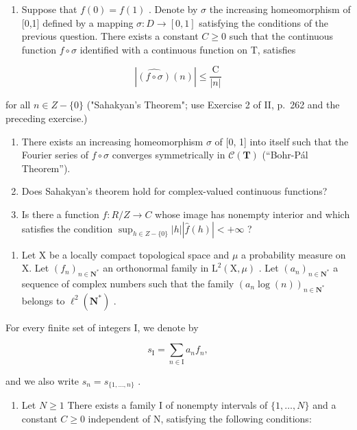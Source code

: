 \begin{enumerate}
\def\labelenumi{\alph{enumi})}
\setcounter{enumi}{2}
\tightlist
\item
  Suppose that \(f(0) = f(1)\) . Denote by \(\sigma\) the increasing homeomorphism of {[}0,1{]} defined by a mapping \(\sigma: D \to [0,1]\) satisfying the conditions of the previous question. There exists a constant \(C \geqslant 0\) such that the continuous function \(f \circ \sigma\) identified with a continuous function on T, satisfies
\end{enumerate}

\[
| \widehat {(f \circ \sigma)} (n) | \leqslant \frac {\mathrm{C}}{| n |}
\]

for all \(n \in Z - \{0\}\) ("Sahakyan's Theorem"; use Exercise 2 of II, p.~262 and the preceding exercise.)

\begin{enumerate}
\def\labelenumi{\alph{enumi})}
\setcounter{enumi}{3}
\item
  There exists an increasing homeomorphism \(\sigma\) of {[}0, 1{]} into itself such that the Fourier series of \(f \circ \sigma\) converges symmetrically in \(\mathcal{C}(\mathbf{T})\) (“Bohr-Pál Theorem”).
\item
  Does Sahakyan's theorem hold for complex-valued continuous functions?
\item
  Is there a function \(f: R/Z \to C\) whose image has nonempty interior and which satisfies the condition \(\sup_{h \in Z - \{0\}} |h||\widehat{f}(h)| < +\infty\) ?
\end{enumerate}

\begin{enumerate}
\def\labelenumi{\arabic{enumi})}
\setcounter{enumi}{46}
\tightlist
\item
  Let X be a locally compact topological space and \(\mu\) a probability measure on X. Let \((f_n)_{n\in \mathbf{N}^*}\) an orthonormal family in \(\mathrm{L}^2 (\mathrm{X},\mu)\) . Let \((a_{n})_{n\in \mathbf{N}^{*}}\) a sequence of complex numbers such that the family \((a_{n}\log (n))_{n\in \mathbf{N}^{*}}\) belongs to \(\ell^2 (\mathbf{N}^*)\) .
\end{enumerate}

For every finite set of integers I, we denote by

\[
s _ {\mathrm{I}} = \sum_ {n \in \mathrm{I}} a _ {n} f _ {n},
\]

and we also write \(s_{n} = s_{\{1,\ldots,n\}}\) .

\begin{enumerate}
\def\labelenumi{\alph{enumi})}
\tightlist
\item
  Let \(N \geqslant 1\) There exists a family I of nonempty intervals of \(\{1, \ldots, N\}\) and a constant \(C \geqslant 0\) independent of N, satisfying the following conditions:
\end{enumerate}


